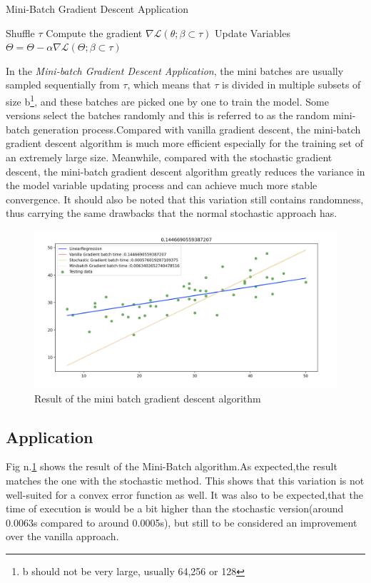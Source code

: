 \documentclass[conference]{IEEEtran}
\begin{document}
\begin{algorithm}
\caption{Mini-Batch Gradient Descent Application}\label{MBGDA}
\begin{algorithmic}[1]
\State Shuffle $\tau$
\State Compute the gradient $\nabla\mathscr{L}(\theta;\beta \subset \tau)$
\State Update Variables $\Theta = \Theta -\alpha\nabla\mathscr{L}(\Theta;\beta \subset \tau)$
\EndFor
\EndFor
{}
\end{algorithmic}
\end{algorithm}
In the \textit{Mini-batch Gradient Descent Application}, the mini batches are usually sampled sequentially from $\tau$, which means that $\tau$ is divided in multiple subsets of size b\footnote{b should not be very large, usually 64,256 or 128}, and these batches are picked one by one to train the model. Some versions select the batches randomly and this is referred to as the random mini-batch generation process.Compared with vanilla gradient descent, the mini-batch gradient descent algorithm is much more efficient especially for the training set of an extremely large size. Meanwhile, compared with the stochastic gradient descent, the mini-batch gradient descent algorithm greatly reduces the variance in the model variable updating process and can achieve much more stable convergence.\cite{JZ2019} It should also be noted that this variation still contains randomness, thus carrying the same drawbacks that the normal stochastic approach has. 
\begin{figure}[htbp]
    \includegraphics[width = 9 cm]{Schermata 2021-05-11 alle 16.25.08.png}
    \caption{Result of the mini batch gradient descent algorithm}
    \label{fig:mini_res}
\end{figure}


\subsection{Application}
Fig n.\ref{fig:mini_res} shows the result of the Mini-Batch algorithm.As expected,the result matches the one with the stochastic method. This shows that this variation is not well-suited for a convex error function as well. 
It was also to be expected,that the time of execution is would be a bit higher than the stochastic version(around 0.0063s compared to around 0.0005s), but still to be considered an improvement over the vanilla approach. 
\end{document}
